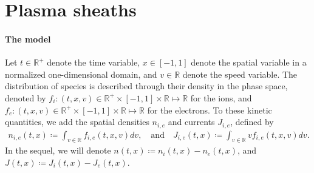 \documentclass{article}
\numberwithin{equation}{section}
\newcommand{\R}{\mathbb{R}}
\newcommand{\todo}[1]{{\color{red}\textbf{#1}}}
\begin{document}
%

\section{Plasma sheaths}

\paragraph{The model}

Let $t\in\mathbb{R}^+$ denote the time variable, $x\in [-1,1]$ denote the spatial variable in a normalized one-dimensional domain, and $v\in\mathbb{R}$ denote the speed variable. The distribution of species is described through their density in the phase space, denoted by $f_i : (t,x,v) \in \R^+ \times [-1,1]\times \R \mapsto \R$ for the ions, and $f_e : (t,x,v) \in \R^+ \times [-1,1]\times \R \mapsto \R$ for the electrons. To these kinetic quantities, we add the spatial densities $n_{i,e}$ and currents $J_{i,e}$, defined by
\begin{align}\label{eq:def_ni_ne}
	n_{i,e} (t,x) \coloneqq \int_{v\in\R} f_{i,e} (t,x,v) dv, \quad\text{and}\quad J_{i,e} (t,x) \coloneqq \int_{v\in\R} v f_{i,e} (t,x,v) dv. 
\end{align}
In the sequel, we will denote $n (t,x) \coloneqq n_i (t,x) - n_e(t,x)$, and $J(t,x) \coloneqq J_i(t,x) - J_e(t,x)$.
\end{document}

